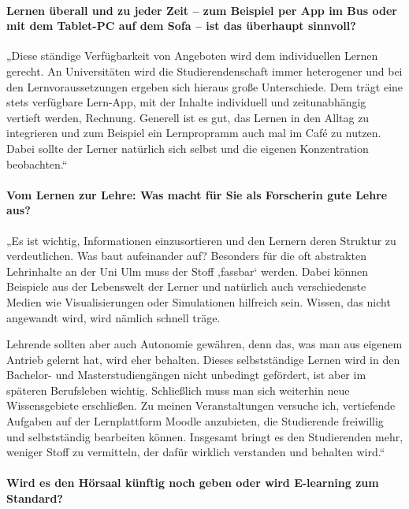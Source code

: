 \paragraph{Lernen überall und zu jeder Zeit – zum Beispiel per App im Bus oder mit dem Tablet-PC auf dem Sofa – ist das überhaupt sinnvoll?}

„Diese ständige Verfügbarkeit von Angeboten wird dem individuellen Lernen gerecht. An Universitäten wird die Studierendenschaft immer heterogener und bei den Lernvoraussetzungen ergeben sich hieraus große Unterschiede. Dem trägt eine stets verfügbare Lern-App, mit der Inhalte individuell und zeitunabhängig vertieft werden, Rechnung. Generell ist es gut, das Lernen in den Alltag zu integrieren und zum Beispiel ein Lernpropramm auch mal im Café zu nutzen. Dabei sollte der Lerner natürlich sich selbst und die eigenen Konzentration beobachten.“ 

\paragraph{Vom Lernen zur Lehre: Was macht für Sie als Forscherin gute Lehre aus?}

„Es ist wichtig, Informationen einzusortieren und den Lernern deren Struktur zu verdeutlichen. Was baut aufeinander auf? Besonders für die oft abstrakten Lehrinhalte an der Uni Ulm muss der Stoff ,fassbar‘ werden. Dabei können Beispiele aus der Lebenswelt der Lerner und natürlich auch verschiedenste Medien wie Visualisierungen oder Simulationen hilfreich sein. Wissen, das nicht angewandt wird, wird nämlich schnell träge. 

Lehrende sollten aber auch Autonomie gewähren, denn das, was man aus eigenem Antrieb gelernt hat, wird eher behalten. Dieses selbstständige Lernen wird in den Bachelor- und Masterstudiengängen nicht unbedingt gefördert, ist aber im späteren Berufsleben wichtig. Schließlich muss man sich weiterhin neue Wissensgebiete erschließen. Zu meinen Veranstaltungen versuche ich, vertiefende Aufgaben auf der Lernplattform Moodle anzubieten, die Studierende freiwillig und selbstständig bearbeiten können. Insgesamt bringt es den Studierenden mehr, weniger Stoff zu vermitteln, der dafür wirklich verstanden und behalten wird.“

\paragraph{Wird es den Hörsaal künftig noch geben oder wird E-learning zum Standard?}


